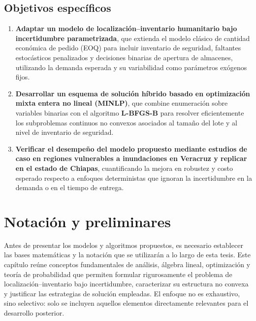 \documentclass[
  spanish,
  us-letterpaper,
]{scrreprt}
\numberwithin{equation}{section}
\begin{document}
\section{\texorpdfstring{\textbf{Objetivos
específicos}}{Objetivos específicos}}\label{objetivos-especuxedficos}

\begin{enumerate}
\def\labelenumi{\arabic{enumi}.}
\item
  \textbf{Adaptar un modelo de localización--inventario humanitario bajo
  incertidumbre parametrizada}, que extienda el modelo clásico de
  cantidad económica de pedido (EOQ) para incluir inventario de
  seguridad, faltantes estocásticos penalizados y decisiones binarias de
  apertura de almacenes, utilizando la demanda esperada y su
  variabilidad como parámetros exógenos fijos.
\item
  \textbf{Desarrollar un esquema de solución híbrido basado en
  optimización mixta entera no lineal (MINLP)}, que combine enumeración
  sobre variables binarias con el algoritmo \textbf{L-BFGS-B} para
  resolver eficientemente los subproblemas continuos no convexos
  asociados al tamaño del lote y al nivel de inventario de seguridad.
\item
  \textbf{Verificar el desempeño del modelo propuesto mediante estudios
  de caso en regiones vulnerables a inundaciones en Veracruz y replicar
  en el estado de Chiapas}, cuantificando la mejora en robustez y costo
  esperado respecto a enfoques deterministas que ignoran la
  incertidumbre en la demanda o en el tiempo de entrega.
\end{enumerate}


\chapter{Notación y preliminares}\label{notaciuxf3n-y-preliminares}

Antes de presentar los modelos y algoritmos propuestos, es necesario
establecer las bases matemáticas y la notación que se utilizarán a lo
largo de esta tesis. Este capítulo reúne conceptos fundamentales de
análisis, álgebra lineal, optimización y teoría de probabilidad que
permiten formular rigurosamente el problema de localización--inventario
bajo incertidumbre, caracterizar su estructura no convexa y justificar
las estrategias de solución empleadas. El enfoque no es exhaustivo, sino
selectivo: solo se incluyen aquellos elementos directamente relevantes
para el desarrollo posterior.
\end{document}
